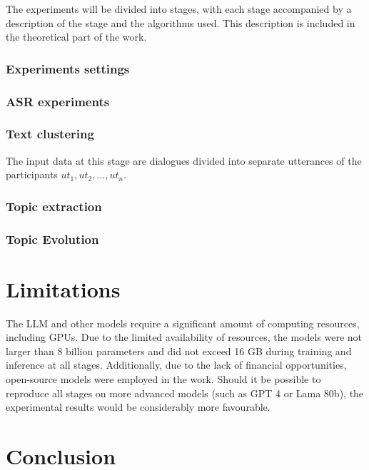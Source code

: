 \documentclass[PMI,VKR]{HSEUniversity}
\begin{document}
The experiments will be divided into stages, with each stage accompanied by a description of the stage and the algorithms used. 
This description is included in the theoretical part of the work.

\subsection{Experiments settings}



\subsection{ASR experiments}



\subsection{Text clustering}

The input data at this stage are dialogues divided into separate utterances of the participants ${ut_1, ut_2, \dots, ut_n}$.



\subsection{Topic extraction}


\subsection{Topic Evolution}

\chapter{Limitations}

The LLM and other models require a significant amount of computing resources, including GPUs. Due to the limited availability of resources, the models were not larger than 8 billion parameters and did not exceed 16 GB during training and inference at all stages. 
Additionally, due to the lack of financial opportunities, open-source models were employed in the work. Should it be possible to reproduce all stages on more advanced models (such as GPT 4 or Lama 80b), the experimental results would be considerably more favourable.

\chapter{Conclusion}


\putbibliography
\end{document}
